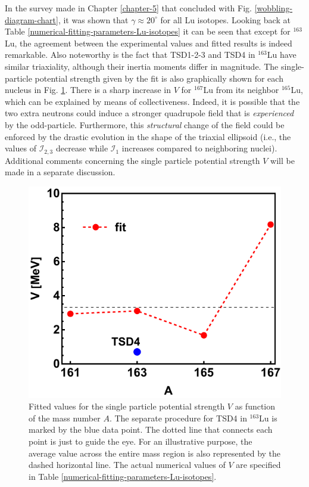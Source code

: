 In the survey made in Chapter \ref{chapter-5} that concluded with Fig. \ref{wobbling-diagram-chart}, it was shown that $\gamma\approx 20^\circ$ for all Lu isotopes. Looking back at Table \ref{numerical-fitting-parameters-Lu-isotopes} it can be seen that except for $^{163}$Lu, the agreement between the experimental values and fitted results is indeed remarkable. Also noteworthy is the fact that TSD1-2-3 and TSD4 in $^{163}$Lu have similar triaxiality, although their inertia moments differ in magnitude. The single-particle potential strength given by the fit is also graphically shown for each nucleus in Fig. \ref{fig-V-param-fitting-procedure}. There is a sharp increase in $V$ for $^{167}$Lu from its neighbor $^{165}$Lu, which can be explained by means of collectiveness. Indeed, it is possible that the two extra neutrons could induce a stronger quadrupole field that is \emph{experienced} by the odd-particle. Furthermore, this \emph{structural} change of the field could be enforced by the drastic evolution in the shape of the triaxial ellipsoid (i.e., the values of $\mathcal{I}_{2,3}$ decrease while $\mathcal{I}_1$ increases compared to neighboring nuclei). Additional comments concerning the single particle potential strength $V$ will be made in a separate discussion.
\begin{figure}
    \centering
    \includegraphics[scale=0.8]{Chapters/Figures/V-param-fitting.pdf}
    \caption{Fitted values for the single particle potential strength $V$ as function of the mass number $A$. The separate procedure for TSD4 in $^{163}$Lu is marked by the blue data point. The dotted line that connects each point is just to guide the eye. For an illustrative purpose, the average value across the entire mass region is also represented by the dashed horizontal line. The actual numerical values of $V$ are specified in Table \ref{numerical-fitting-parameters-Lu-isotopes}.}
    \label{fig-V-param-fitting-procedure}
\end{figure}

